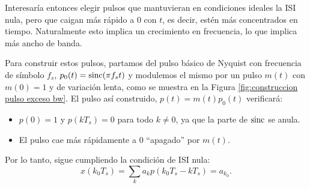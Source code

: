 Interesaría entonces elegir pulsos que mantuvieran en condiciones ideales la ISI nula, pero que caigan más rápido a $0$ con $t$, es decir, estén más concentrados en tiempo. Naturalmente esto implica un crecimiento en frecuencia, lo que implica más ancho de banda.

Para construir estos pulsos, partamos del pulso básico de Nyquist con frecuencia de símbolo $f_s$, $p_0(t) = \operatorname{sinc} (\pi f_s t)$ y modulemos el mismo por un pulso $m(t)$ con $m(0)=1$ y de variación lenta, como se muestra en la Figura \ref{fig:construccion pulso exceso bw}. El pulso así construido, $p(t) = m(t)p_0(t)$ verificará:
\begin{itemize}
    \item $p(0)=1$ y $p(kT_s)=0$ para todo $k\neq 0$, ya que la parte de $\operatorname{sinc}$ se anula.
    \item El pulso cae más rápidamente a $0$ ``apagado'' por $m(t)$.
\end{itemize}
Por lo tanto, sigue cumpliendo la condición de ISI nula:
\begin{equation*}
    x(k_0 T_s) = \sum_k a_k p(k_0T_s-kT_s) = a_{k_0}.
\end{equation*}

